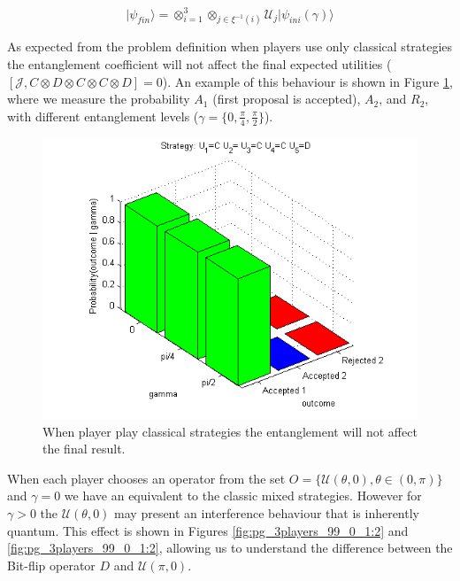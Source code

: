 \begin{equation}
\vert\psi_{fin}\rangle=\otimes_{i=1}^{3}\otimes_{j\in\xi^{-1}(i)}\mathcal{U}_{j}\vert\psi_{ini}(\gamma)\rangle
\label{eq:piratas_final_move_23}
\end{equation} 

As expected from the problem definition when players use only classical strategies the entanglement coefficient will not affect the final expected utilities ($[ \mathcal{J} , C \otimes D \otimes C \otimes C \otimes D ] = 0 $).
An example of this behaviour is shown in Figure \ref{fig:pg_3players_99_0_1}, where we measure the probability $A_{1}$ (first proposal is accepted), $A_{2}$, and $R_{2}$, with different entanglement levels ($\gamma= \{ 0 , \frac{ \pi}{4}, \frac{\pi}{2} \} $).

\begin{figure}[h]
\centering 
\includegraphics[scale=0.80]{Figures/1.5qubit/CDCCD.png}
\caption{When player play classical strategies the entanglement will not affect the final result. }
\label{fig:pg_3players_99_0_1}
\end{figure}

When each player chooses an operator from the set $O = \{ \mathcal{U} ( \theta , 0) , \theta \in (0, \pi) \}$ and $\gamma=0$ we have an equivalent to the classic mixed strategies. However for $\gamma >0$ the $\mathcal{U} ( \theta , 0)$ may present an interference behaviour that is inherently quantum. This effect is shown in Figures \ref{fig:pg_3players_99_0_1:2} and \ref{fig:pg_3players_99_0_1:2}, allowing us to understand the difference between the Bit-flip operator $D$ and $\mathcal{U} ( \pi , 0)$.



